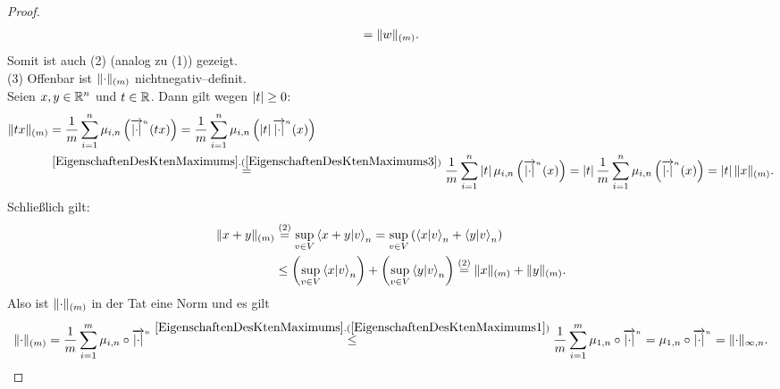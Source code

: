 \begin{proof}
\begin{align*}
= \lVert w\rVert _{(m)}\text.
\end{align*}
Somit ist auch (2) (analog zu (1)) gezeigt.\\
(3) Offenbar ist $\lVert\cdot\rVert_{(m)}$ nichtnegativ--definit.\\
Seien $x, y \in \mathbb{R}^n$ und $t \in \mathbb{R}$. Dann gilt wegen $\left|t\right| \ge 0$:
\begin{align*}
\norm{tx}_{(m)}&= 
\frac 1 m \sum_{i=1}^n\mu_{i, n}\left(\pfeil{\abs\cdot}n(tx) \right)
= \frac 1 m \sum_{i=1}^n\mu_{i, n}\left(\abs{t} \pfeil{\abs\cdot}n(x) \right)\\
&\overset{\refclaim{EigenschaftenDesKtenMaximums}
{EigenschaftenDesKtenMaximums3}}=
\frac 1 m\sum_{i=1}^n\abs{t}\mu_{i, n}\left(\pfeil{\abs\cdot}n(x) \right)
= \abs{t}\frac 1 m\sum_{i=1}^n\mu_{i, n}\left(\pfeil{\abs\cdot}n(x) \right)
= \abs{t}\norm{x}_{(m)}\text.
\end{align*}
Schließlich gilt:
\begin{align*}
\lVert x+y\rVert_{(m)} &\overset{(2)}=
\sup_{v \in V} \left\langle x+y |v\right\rangle_n 
= \sup_{v \in V}\left(\left\langle x |v\right\rangle_n + \left\langle y |v\right\rangle_n \right)\\
&\le \left(\sup_{v \in V}\left\langle x |v\right\rangle_n \right) 
+ \left(\sup_{v \in V}\left\langle y |v\right\rangle_n \right)
\overset{(2)}= \lVert x\rVert_{(m)} + \lVert y\rVert _{(m)}\text.
\end{align*}
Also ist $\lVert\cdot\rVert_{(m)}$ in der Tat eine Norm und es gilt
\[\norm\cdot _{(m)}
 = \frac 1 m \sum_{i=1}^m \mu_{i, n} \circ \pfeil{\abs\cdot}n
 \overset{\refclaim{EigenschaftenDesKtenMaximums}
 {EigenschaftenDesKtenMaximums1}}\le
 \frac 1 m \sum_{i=1}^m \mu_{1, n} \circ \pfeil{\abs\cdot}n
 = \mu_{1, n} \circ \pfeil{\abs\cdot}n = \norm\cdot_{\infty, n}\text.\]
\end{proof}